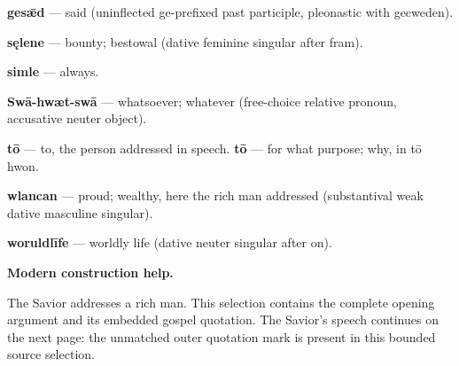 \textbf{gesǣd} — said (uninflected ge-prefixed past participle, pleonastic with gecweden).

\textbf{sęlene} — bounty; bestowal (dative feminine singular after fram).

\textbf{simle} — always.

\textbf{Swā-hwæt-swā} — whatsoever; whatever (free-choice relative pronoun, accusative neuter object).

\textbf{tō} — to, the person addressed in speech. \textbf{tō} — for what purpose; why, in tō hwon.

\textbf{wlancan} — proud; wealthy, here the rich man addressed (substantival weak dative masculine singular).

\textbf{woruldlīfe} — worldly life (dative neuter singular after on).

\textbf{Modern construction help.}

The Savior addresses a rich man. This selection contains the complete opening argument and its embedded gospel quotation. The Savior’s speech continues on the next page: the unmatched outer quotation mark is present in this bounded source selection.

